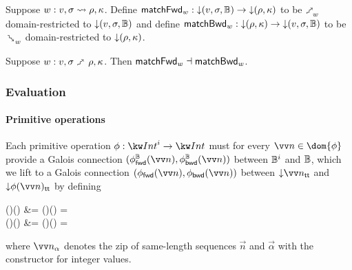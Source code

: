 \begin{definition}
   Suppose $w: v, \sigma \rightsquigarrow \rho, \kappa$. Define $\mathsf{matchFwd}_{w}: {\downarrow}{(v,\sigma,\mathbb{B})} \to {\downarrow}{(\rho,\kappa)}$ to be $\matchFwdR{w}$ domain-restricted to ${\downarrow}{(v,\sigma,\mathbb{B})}$ and define $\mathsf{matchBwd}_{w}: {\downarrow}{(\rho,\kappa)} \to {\downarrow}{(v,\sigma,\mathbb{B})}$ to be $\matchBwdR{w}$ domain-restricted to ${\downarrow}{(\rho,\kappa)}$.
\end{definition}

\begin{theorem}
\label{thm:core-language:match:gc}
   Suppose $w: v, \sigma \matchFwdS \rho, \kappa$.  Then $\mathsf{matchFwd}_{w} \dashv \mathsf{matchBwd}_{w}$.
\end{theorem}

\subsubsection{Evaluation}

\paragraph{Primitive operations}

Each primitive operation $\phi: \tyInt^{i} \to \tyInt$ must for every $\vec{n} \in \dom{\phi}$ provide a Galois connection $(\primFwdBool{\phi}(\vec{n}), \primBwdBool{\phi}(\vec{n}))$ between $\mathbb{B}^i$ and $\mathbb{B}$, which we lift to a Galois connection $(\primFwd{\phi}(\vec{n}), \primBwd{\phi}(\vec{n}))$ between $\Below{\vec{\annInt{n}{\TT}}}$ and $\Below{\annInt{\phi(\vec{n})}{\TT}}$ by defining
\begin{definition}
\label{def:core-language:primop-gc}
\begin{salign}
   \primFwd{\phi}()() &= 
   \primFwdBool{\phi}()(\vec{\alpha}) = \beta
   \\
   \primBwd{\phi}()() &= 
   \primBwdBool{\phi}()(\beta) = \vec{\alpha}
\end{salign}
\end{definition}

\noindent where $\vec{\annInt{n}{\alpha}}$ denotes the zip of same-length sequences $\vec{n}$ and $\vec{\alpha}$ with the constructor for integer values.





